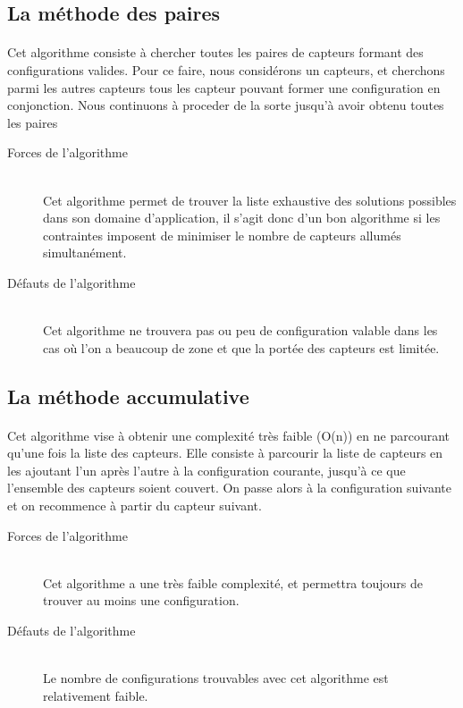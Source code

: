 \subsection{La méthode des paires}
    \paragraph{}
        Cet algorithme consiste à chercher toutes les paires de capteurs formant
        des configurations valides.
        Pour ce faire, nous considérons un capteurs, et cherchons parmi les
        autres capteurs tous les capteur pouvant former une configuration en
        conjonction.
        Nous continuons à proceder de la sorte jusqu'à avoir obtenu toutes les
        paires
    \begin{description}
        \item[Forces de l'algorithme]\hfill \\
            Cet algorithme permet de trouver la liste exhaustive des solutions
            possibles dans son domaine d'application, il s'agit donc d'un bon
            algorithme si les contraintes imposent de minimiser le nombre de
            capteurs allumés simultanément.
        \item[Défauts de l'algorithme]\hfill \\
            Cet algorithme ne trouvera pas ou peu de configuration valable dans
            les cas où l'on a beaucoup de zone et que la portée des capteurs est
            limitée.
    \end{description}

\subsection{La méthode accumulative}
    \paragraph{}
        Cet algorithme vise à obtenir une complexité très faible (O(n)) en ne
        parcourant qu'une fois la liste des capteurs.
        Elle consiste à parcourir la liste de capteurs en les ajoutant l'un
        après l'autre à la configuration courante, jusqu'à ce que l'ensemble des
        capteurs soient couvert. On passe alors à la configuration suivante et
        on recommence à partir du capteur suivant.

    \begin{description}
        \item[Forces de l'algorithme]\hfill \\
            Cet algorithme a une très faible complexité, et permettra toujours
            de trouver au moins une configuration.
        \item[Défauts de l'algorithme]\hfill \\
            Le nombre de configurations trouvables avec cet algorithme est
            relativement faible.
    \end{description}

